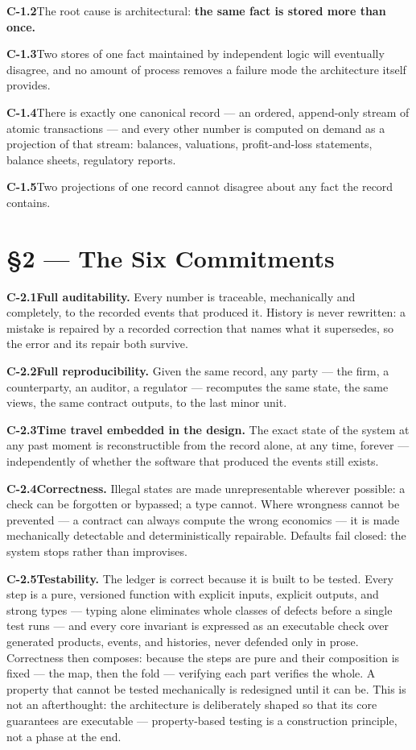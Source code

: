 \documentclass[11pt,a4paper]{article}
\newcommand{\clause}[2]{\par\medskip\noindent\textbf{#1}\hspace{0.6em}#2}
\begin{document}
\clause{C-1.2}{The root cause is architectural: \textbf{the same fact is stored
more than once.}}

\clause{C-1.3}{Two stores of one fact maintained by independent logic will
eventually disagree, and no amount of process removes a failure mode the
architecture itself provides.}

\clause{C-1.4}{There is exactly one canonical record --- an ordered, append-only
stream of atomic transactions --- and every other number is computed on demand as
a projection of that stream: balances, valuations, profit-and-loss statements,
balance sheets, regulatory reports.}

\clause{C-1.5}{Two projections of one record cannot disagree about any fact the
record contains.}

\section*{\S2 --- The Six Commitments}

\clause{C-2.1}{\textbf{Full auditability.} Every number is traceable, mechanically
and completely, to the recorded events that produced it. History is never
rewritten: a mistake is repaired by a recorded correction that names what it
supersedes, so the error and its repair both survive.}

\clause{C-2.2}{\textbf{Full reproducibility.} Given the same record, any party ---
the firm, a counterparty, an auditor, a regulator --- recomputes the same state,
the same views, the same contract outputs, to the last minor unit.}

\clause{C-2.3}{\textbf{Time travel embedded in the design.} The exact state of the
system at any past moment is reconstructible from the record alone, at any time,
forever --- independently of whether the software that produced the events still
exists.}

\clause{C-2.4}{\textbf{Correctness.} Illegal states are made unrepresentable
wherever possible: a check can be forgotten or bypassed; a type cannot. Where
wrongness cannot be prevented --- a contract can always compute the wrong
economics --- it is made mechanically detectable and deterministically
repairable. Defaults fail closed: the system stops rather than improvises.}

\clause{C-2.5}{\textbf{Testability.} The ledger is correct because it is built to
be tested. Every step is a pure, versioned function with explicit inputs, explicit
outputs, and strong types --- typing alone eliminates whole classes of defects
before a single test runs --- and every core invariant is expressed as an
executable check over generated products, events, and histories, never defended
only in prose. Correctness then composes: because the steps are pure and their
composition is fixed --- the map, then the fold --- verifying each part verifies
the whole. A property that cannot be tested mechanically is redesigned until it
can be. This is not an afterthought: the architecture is deliberately shaped so
that its core guarantees are executable --- property-based testing is a
construction principle, not a phase at the end.}
\end{document}
